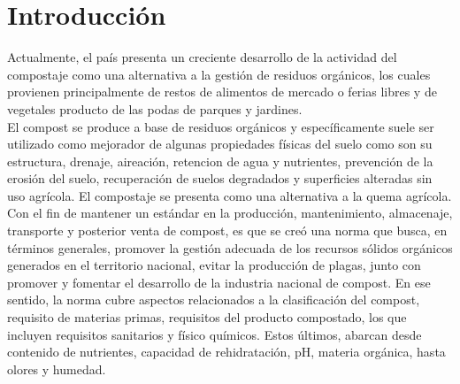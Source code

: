 \documentclass[12pt, letterpaper]{article}
\begin{document}
\section{Introducción}
Actualmente, el país presenta un creciente desarrollo de la actividad del compostaje como una alternativa a la gestión de residuos orgánicos, los cuales provienen principalmente de restos de alimentos de mercado o ferias libres y de vegetales producto de las podas de parques y jardines. \\
El compost se produce a base de residuos orgánicos y específicamente suele ser utilizado como mejorador de algunas propiedades físicas del suelo como son su estructura, drenaje, aireación, retencion de agua y nutrientes, prevención de la erosión del suelo, recuperación de suelos degradados y superficies alteradas sin uso agrícola. El compostaje se presenta como una alternativa a la quema agrícola.\\
Con el fin de mantener un estándar en la producción, mantenimiento, almacenaje, transporte y posterior venta de compost, es que se creó una norma que busca, en términos generales, promover la gestión adecuada de los recursos sólidos orgánicos generados en el territorio nacional, evitar la producción de plagas, junto con promover y fomentar el desarrollo de la industria nacional de compost. En ese sentido, la norma cubre aspectos relacionados a la clasificación del compost, requisito de materias primas, requisitos del producto compostado, los que incluyen requisitos sanitarios y físico químicos. Estos últimos, abarcan desde contenido de nutrientes, capacidad de rehidratación, pH, materia orgánica, hasta olores y humedad.\\


\end{document}
